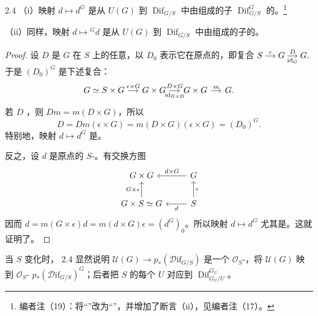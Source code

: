 \begin{SGAresult}{}{2.4}
（i）映射 $d\mapsto d^G$ 是从 $U(G)$ 到 $\operatorname{Dif}_{G/S}$ 中由组成的子 $\operatorname{Dif}_{G/S}^G$ 的。\footnote{编者注（19）：将“”改为“”，并增加了断言（ii），见编者注（17）。}

（ii）同样，映射 $d\mapsto{}^Gd$ 是从 $U(G)$ 到 $\operatorname{Dif}_{G/S}$ 中由组成的子的。
\end{SGAresult}
\begin{proof}
设 $D$ 是 $G$ 在 $S$ 上的任意，以 $D_0$ 表示它在原点的，即复合
$\begin{tikzcd}[cramped,column sep=small]S\arrow[r,"\epsilon"]&G\arrow[r,"D","\operatorname{id}_G"']&G.\end{tikzcd}$
于是 $(D_0)^G$ 是下述复合：
\[
\begin{tikzcd}[column sep=small]
G\simeq S\times G\arrow[r,"\epsilon\times G"]&G\times G\arrow[r,"D\times G","\operatorname{id}_{G\times G}"']&G\times G\arrow[r,"m"]&G.
\end{tikzcd}
\]
若 $D$ ，则 $Dm=m(D\times G)$，所以
\[
D=Dm(\epsilon\times G)=m(D\times G)(\epsilon\times G)=(D_0)^G.
\]
特别地，映射 $d\mapsto d^G$ 是。

反之，设 $d$ 是原点的 $S$-。有交换方图
\[
\begin{tikzcd}
G\times G&G\arrow[l,"d\times G"']\\
G\times S\simeq G\arrow[u,"G\times\epsilon"]&S\arrow[l,"d"]\arrow[u,"\epsilon"']
\end{tikzcd}
\]
因而 $d=m(G\times\epsilon)d=m(d\times G)\epsilon=(d^G)_0$。所以映射 $d\mapsto d^G$ 尤其是。这就证明了。
\end{proof}
当 $S$ 变化时， 2.4 显然说明 $\mathcal U(G)\to p_*(\mathscr{D}\mathrm{if}_{G/S})$ 是一个 $\mathcal O_S$-，将 $\mathcal U(G)$ 映到 $\mathcal O_S$- $p_*(\mathscr{D}\mathrm{if}_{G/S})^G$；后者把 $S$ 的每个 $U$ 对应到 $\operatorname{Dif}_{G_U/U}^{G_U}$。

